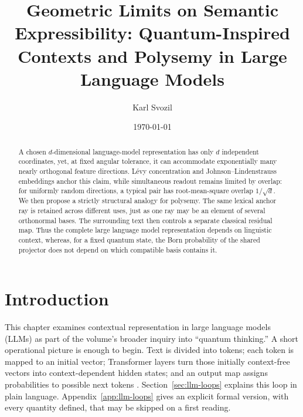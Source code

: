 \documentclass[
  aps,
  reprint,
  superscriptaddress,
  floatfix,
  nofootinbib,
  longbibliography
]{revtex4-2}
\begin{document}
\title{Geometric Limits on Semantic Expressibility: Quantum-Inspired Contexts and Polysemy in Large Language Models}

\author{Karl Svozil}

\date{\today}

\begin{abstract}
A chosen $d$-dimensional language-model representation has only $d$
independent coordinates, yet, at fixed angular tolerance, it can accommodate
exponentially many nearly orthogonal feature directions.  L\'evy concentration
and Johnson--Lindenstrauss embeddings anchor this claim, while simultaneous
readout remains limited by overlap: for uniformly random directions, a typical
pair has root-mean-square overlap $1/\sqrt d$.  We then propose a strictly
structural analogy for polysemy.  The same lexical anchor ray is retained
across different uses, just as one ray may be an element of several
orthonormal bases.  The surrounding text then controls a separate classical
residual map.  Thus the complete large language model representation depends
on linguistic context, whereas, for a fixed quantum state, the Born probability
of the shared projector does not depend on which compatible basis contains it.
\end{abstract}

\maketitle


\section{Introduction}
\label{sec:intro}

This chapter examines contextual representation in large language models
(LLMs) as part of the volume's broader inquiry into ``quantum thinking.''  A
short operational picture is enough to begin.  Text is divided into tokens;
each token is mapped to an initial vector; Transformer layers turn those
initially context-free vectors into context-dependent hidden states; and an
output map assigns probabilities to possible next tokens
\cite{Vaswani-2017-Attention}.  Section~\ref{sec:llm-loops} explains this loop
in plain language.  Appendix~\ref{app:llm-loops} gives an explicit formal
version, with every quantity defined, that may be skipped on a first reading.
\end{document}
